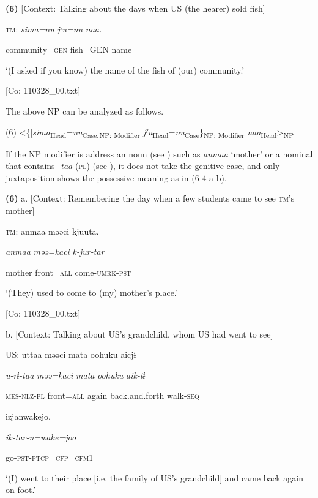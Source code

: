 \textbf{(6)}    [Context: Talking about the days when US (the hearer) sold fish]

  \textsc{tm}:  \textit{sima=nu}  \textit{jˀu=nu}  \textit{naa.}

    community=\textsc{gen}  fish=GEN  name

    ‘(I asked if you know) the name of the fish of (our) community.’

    [Co: 110328\_00.txt]

The above NP can be analyzed as follows.

(6)    <\{[\textit{sima}\textsubscript{Head}=\textit{nu}\textsubscript{Case}]\textsubscript{NP: Modifier} \textit{jˀu}\textsubscript{Head}=\textit{nu}\textsubscript{Case}\}\textsubscript{NP: Modifier} \textit{naa}\textsubscript{Head}>\textsubscript{NP}

If the NP modifier is address an noun (see ) such as \textit{anmaa} ‘mother’ or a nominal that contains \textit{{}-taa} (\textsc{pl}) (see ), it does not take the genitive case, and only juxtaposition shows the possessive meaning as in (6-4 a-b).

\textbf{(6)}  a.  [Context: Remembering the day when a few students came to see \textsc{tm}’s mother]

    \textsc{tm}:  anmaa  məəci  kjuuta.

      \textit{anmaa}  \textit{məə=kaci}  \textit{k-jur-tar}

      mother  front=\textsc{all}  come-\textsc{umrk}-\textsc{pst}

      ‘(They) used to come to (my) mother’s place.’

      [Co: 110328\_00.txt]

  b.  [Context: Talking about US’s grandchild, whom US had went to see]

    US:  uttaa  məəci  mata  {\textbar}oohuku{\textbar}  aicjɨ

      \textit{u-rɨ-taa}  \textit{məə=kaci}  \textit{mata}  \textit{oohuku}  \textit{aik-tɨ}

      \textsc{mes}-\textsc{nlz}-\textsc{pl}  front=\textsc{all}  again  back.and.forth  walk-\textsc{seq}

      izjanwakejo.

      \textit{ik-tar-n=wake=joo}

      go-\textsc{pst}-\textsc{ptcp}=\textsc{cfp}=\textsc{cfm}1

      ‘(I) went to their place [i.e. the family of US’s grandchild] and came back again on foot.’

